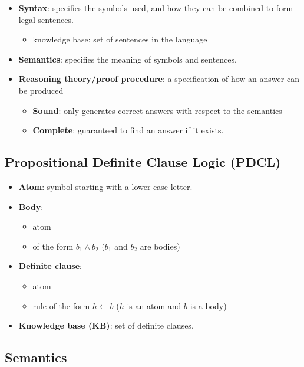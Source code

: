\documentclass{article}
\begin{document}
\begin{itemize}
    \item \textbf{Syntax}: specifies the symbols used, and how they can be combined to form legal sentences.
        \begin{itemize}
            \item knowledge base: set of sentences in the language
        \end{itemize}
    \item \textbf{Semantics}: specifies the meaning of symbols and sentences.
    \item \textbf{Reasoning theory/proof procedure}: a specification of how an answer can be produced
        \begin{itemize}
            \item \textbf{Sound}: only generates correct answers with respect to the semantics
            \item \textbf{Complete}: guaranteed to find an answer if it exists.
        \end{itemize}
\end{itemize}

\subsection{Propositional Definite Clause Logic (PDCL)}

\begin{itemize}
    \item \textbf{Atom}: symbol starting with a lower case letter.
    \item \textbf{Body}: 
        \begin{itemize}
            \item atom
            \item of the form $b_1 \wedge b_2$ ($b_1$ and $b_2$ are bodies)
        \end{itemize}
    \item \textbf{Definite clause}:
        \begin{itemize}
            \item atom
            \item rule of the form $h \leftarrow b$ ($h$ is an atom and $b$ is a body)
        \end{itemize}
    \item \textbf{Knowledge base (KB)}: set of definite clauses.
\end{itemize}

\subsection{Semantics}
\end{document}
